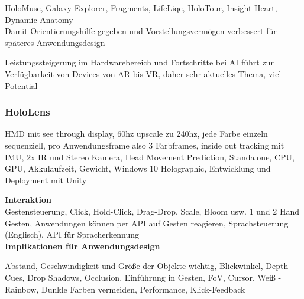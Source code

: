 HoloMuse, Galaxy Explorer, Fragments, LifeLiqe, HoloTour, Insight Heart, Dynamic Anatomy\\
Damit Orientierungshilfe gegeben und Vorstellungsvermögen verbessert für späteres Anwendungsdesign

Leistungssteigerung im Hardwarebereich und Fortschritte bei AI führt zur Verfügbarkeit von Devices von AR bis VR, daher sehr aktuelles Thema, viel Potential

\subsubsection{HoloLens}
\label{sec-2-1-2}
	

HMD mit see through display, 60hz upscale zu 240hz, jede Farbe einzeln sequenziell, pro Anwendungsframe also 3 Farbframes, inside out tracking mit IMU, 2x IR und Stereo Kamera, Head Movement Prediction, Standalone, CPU, GPU, Akkulaufzeit, Gewicht, Windows 10 Holographic, Entwicklung und Deployment mit Unity

\textbf{Interaktion}\\

Gestensteuerung, Click, Hold-Click, Drag-Drop, Scale, Bloom usw. 1 und 2 Hand Gesten, Anwendungen können per API auf Gesten reagieren, Sprachsteuerung (Englisch), API für Spracherkennung\\

\textbf{Implikationen für Anwendungsdesign}

Abstand, Geschwindigkeit und Größe der Objekte wichtig, Blickwinkel, Depth Cues, Drop Shadows, Occlusion, Einführung in Gesten, FoV, Cursor, Weiß - Rainbow, Dunkle Farben vermeiden, Performance, Klick-Feedback
